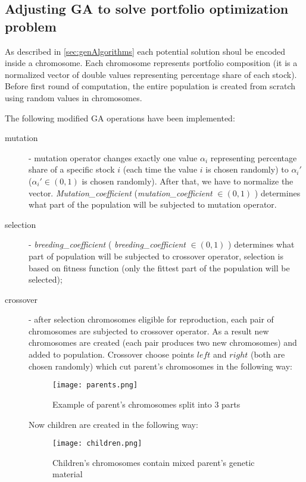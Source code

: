 \subsection{Adjusting GA to solve portfolio optimization problem}

As described in \ref{sec:genAlgorithms} each potential solution shoul be encoded inside a chromosome. 
Each chromosome represents portfolio composition (it is a normalized vector of double values representing percentage share of each stock).
Before first round of computation, the entire population is created from scratch using random values in chromosomes.

The following modified GA operations have been implemented:
\begin{description}
  \item [mutation]
      - mutation operator changes exactly one value $ \alpha_{i} $ representing percentage share of a specific stock $i$ (each time the value $i$ is chosen randomly)
      to $\alpha_{i}'$ ($\alpha_{i}' \in (0,1)$ is chosen randomly). 
      After that, we have to normalize the vector.
      \emph{Mutation\_coefficient} (\emph{mutation\_coefficient} $ \in (0,1)$ ) determines what part of the population will be subjected to mutation operator.
  \item [selection]
      - \emph{breeding\_coefficient} ( \emph{breeding\_coefficient} $ \in (0,1)$ ) determines what part of population will be subjected to crossover operator, selection is based on 
      fitness function (only the fittest part of the population will be selected);
  \item [crossover]
      - after selection chromosomes eligible for reproduction, each pair of chromosomes are subjected to crossover operator. As a result new chromosomes are created (each pair
      produces two new chromosomes) and added to population. Crossover choose points $left$  and $right$ (both are chosen randomly) which cut parent's chromosomes in the following
      way: 
	  \begin{figure}[H]
	    \begin{center}
	      \texttt{[image: parents.png]}
	    \end{center}
	    \caption{Example of parent's chromosomes split into 3 parts}
	  \end{figure}

	Now children are created in the following way:    
	  \begin{figure}[H]
	    \begin{center}
	      \texttt{[image: children.png]}
	    \end{center}
	    \caption{Children's chromosomes contain mixed parent's genetic material}
	  \end{figure}

\end{description}

